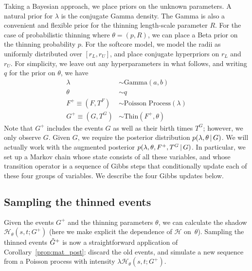 \documentclass{statsoc}
\begin{document}
Taking a Bayesian approach, we place priors on the unknown parameters. A natural prior for $\lambda$ is the conjugate Gamma density. The Gamma is also a 
convenient and flexible prior for the thinning length-scale parameter $R$. For the case of probabilistic thinning where $\theta = (p,R)$, we can place a Beta prior on the 
thinning probability $p$. For the softcore model, we model the radii as uniformly distributed over $[r_L, r_U]$, and place conjugate
hyperpriors on $r_L$ and $r_U$. For simplicity, we leave out any hyperparameters in what follows, and writing $q$
for the prior on $\theta$, we have
\begin{align}
  \lambda &\sim \text{Gamma}(a,b) \\
  \theta  &\sim q \\
  F^+ \equiv (F,T^F) & \sim \text{Poisson Process}(\lambda) \\
  G^+ \equiv (G,T^G) & \sim \text{Thin}(F^+, \theta)
\end{align}
Note that $G^+$ includes the \matern events $G$ as well as their birth times $T^G$; however, we only observe $G$. Given $G$, we require the posterior 
distribution $p(\lambda, \theta \,|\, G)$. 
We will actually work with the augmented posterior $p(\lambda, \theta, F^+, T^G \,|\, G)$. In particular, we set up a Markov chain whose state 
consists of all these variables, and whose transition operator is a 
sequence of Gibbs steps that conditionally update %
each of these four groups of variables. We describe the four Gibbs updates below.

\subsection{Sampling the thinned events}
Given the \matern events $G^+$ and the thinning parameters $\theta$, we can calculate the shadow $\mathscr{H}_{\theta}(s,t;G^+)$ 
(here we make explicit the dependence of $\mathscr{H}$ on~$\theta$).
Sampling the thinned events $\tilde{G}^+$ is now a straightforward application of Corollary~\ref{prop:mat_post}:
discard the old events, and simulate a new sequence from a Poisson process with intensity $\lambda \mathscr{H}_{\theta}(s,t;G^+)$. 
\end{document}
